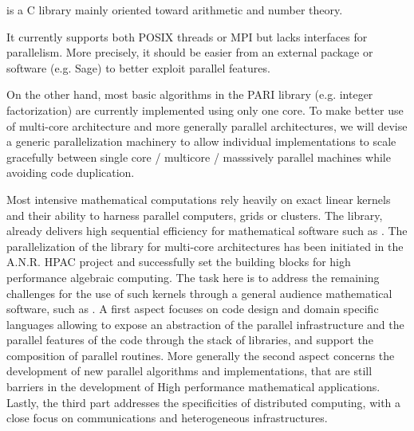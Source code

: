 \begin{workpackage}[id=hpc,wphases=36-48,
  title=High Performance Computing,
  PSRM=1, %
  LLRM=12, %
  SARM=1, %
  UKRM=1, %
  UBRM=1, %
  UJFRM=12]
\begin{wpdescription}
\end{wpdescription}
\begin{tasklist}
\begin{task}[title=PARI,id=hpc_pari]
  \Pari is a C library mainly oriented toward arithmetic and number theory.
  
  It currently supports both POSIX threads or MPI but lacks interfaces for
  parallelism. More precisely, it should be easier from an external package
  or software (e.g. Sage) to better exploit \Pari parallel features.

  On the other hand, most basic algorithms in the PARI library (e.g. integer
  factorization) are currently implemented using only one core. To
  make better use of multi-core architecture and more generally parallel
  architectures, we will devise a generic parallelization machinery
  to allow individual implementations to scale gracefully between single
  core / multicore / masssively parallel machines while avoiding code
  duplication.
\end{task}

\begin{task}[title=GAP,id=hpc_gap]

\end{task}

\begin{task}[title=Linbox,id=hpc_linbox]
Most intensive mathematical computations rely heavily on exact linear kernels
and their ability to harness parallel computers, grids or clusters. The \Linbox
library, already delivers high sequential efficiency for mathematical software
such as \Sage. The parallelization of the library for multi-core architectures
has been initiated in the A.N.R. HPAC project and successfully set the building
blocks for high performance algebraic computing. 
The task here is to  address the remaining challenges for the use of such
kernels through a general audience mathematical software, such as \Sage.
A first aspect focuses on code design and domain specific languages allowing to
expose an abstraction of the parallel infrastructure and the parallel features
of the code through the stack of libraries, and support the
composition of parallel routines.  More generally the second aspect concerns the
development of new parallel algorithms and implementations, that are still
barriers in the development of High performance mathematical
applications. Lastly, the third part addresses the specificities of  distributed
computing, with a close focus on communications and heterogeneous infrastructures.


\end{task}
\end{tasklist}
\end{workpackage}
